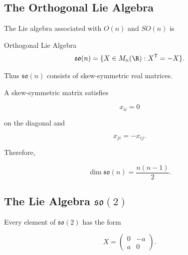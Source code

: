 \begin{center}
\end{center}

\subsection{The Orthogonal Lie Algebra}
\label{subsec:orthogonal-lie-algebra}

The Lie algebra associated with \(O(n)\) and \(SO(n)\) is

\begin{definitionbox}{Orthogonal Lie Algebra}
\[ \mathfrak{so}(n)=\{X\in M_n(\R):X^{\mathsf T}=-X\}. \]
\end{definitionbox}

Thus \(\mathfrak{so}(n)\) consists of skew-symmetric real matrices.

A skew-symmetric matrix satisfies

\[ x_{ii}=0 \]

on the diagonal and

\[ x_{ji}=-x_{ij}. \]

Therefore,

\[ \boxed{\dim\mathfrak{so}(n)=\frac{n(n-1)}{2}.} \]

\subsection{The Lie Algebra \(\mathfrak{so}(2)\)}
\label{subsec:so2-lie-algebra}

Every element of \(\mathfrak{so}(2)\) has the form

\[ X=
\begin{pmatrix}
0&-a\\
a&0
\end{pmatrix}. \]

